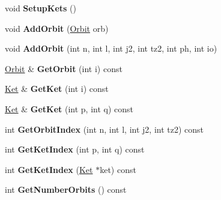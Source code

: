 \begin{DoxyCompactItemize}
\item 
\hypertarget{classModelSpace_ae1a3578ed5aabec2956998a870a4e2d2}{void {\bfseries Setup\-Kets} ()}\label{classModelSpace_ae1a3578ed5aabec2956998a870a4e2d2}

\item 
\hypertarget{classModelSpace_ad8acc2ca5b475862101595d911987a7e}{void {\bfseries Add\-Orbit} (\hyperlink{structOrbit}{Orbit} orb)}\label{classModelSpace_ad8acc2ca5b475862101595d911987a7e}

\item 
\hypertarget{classModelSpace_aad3b42327ba5e1d67569cc31f30c7070}{void {\bfseries Add\-Orbit} (int n, int l, int j2, int tz2, int ph, int io)}\label{classModelSpace_aad3b42327ba5e1d67569cc31f30c7070}

\item 
\hypertarget{classModelSpace_afe51ff3553478b349eba65c61a19ca3e}{\hyperlink{structOrbit}{Orbit} \& {\bfseries Get\-Orbit} (int i) const }\label{classModelSpace_afe51ff3553478b349eba65c61a19ca3e}

\item 
\hypertarget{classModelSpace_adc36e64fb3bb4dc76819f91e9057844f}{\hyperlink{classKet}{Ket} \& {\bfseries Get\-Ket} (int i) const }\label{classModelSpace_adc36e64fb3bb4dc76819f91e9057844f}

\item 
\hypertarget{classModelSpace_ab3662f5e12ce6da0164c8adbe1abbb95}{\hyperlink{classKet}{Ket} \& {\bfseries Get\-Ket} (int p, int q) const }\label{classModelSpace_ab3662f5e12ce6da0164c8adbe1abbb95}

\item 
\hypertarget{classModelSpace_ab3d8cb8214e082773caa5820773ee16e}{int {\bfseries Get\-Orbit\-Index} (int n, int l, int j2, int tz2) const }\label{classModelSpace_ab3d8cb8214e082773caa5820773ee16e}

\item 
\hypertarget{classModelSpace_ad2622b2d268c55b89a2082189f7185b1}{int {\bfseries Get\-Ket\-Index} (int p, int q) const }\label{classModelSpace_ad2622b2d268c55b89a2082189f7185b1}

\item 
\hypertarget{classModelSpace_ae87e8738f2aed2f23eab933b77a3772f}{int {\bfseries Get\-Ket\-Index} (\hyperlink{classKet}{Ket} $\ast$ket) const }\label{classModelSpace_ae87e8738f2aed2f23eab933b77a3772f}

\item 
\hypertarget{classModelSpace_a48004a4a3d559081827da87c9c4bfe94}{int {\bfseries Get\-Number\-Orbits} () const }\label{classModelSpace_a48004a4a3d559081827da87c9c4bfe94}


\end{DoxyCompactItemize}
